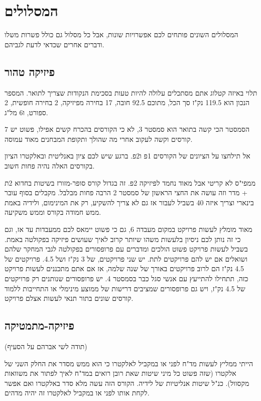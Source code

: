 \documentclass[a4paper,12pt]{article}
\begin{document}
\section{המסלולים}

המסלולים השונים פותחים לכם אפשרויות שונות, אבל כל מסלול גם כולל פשרות משלו ודברים אחרים שכדאי לדעת לגביהם.

\subsection{פיזיקה טהור}

תלוי באיזה קטלוג אתם מסתכלים עלולה להיות טעות בסכימת הנקודות שצריך לתואר. המספר הנכון הוא 119.5 נק"ז סך הכל, מתוכם 92.5 חובה, 17 בחירה מפיזיקה, 2 בחירה חופשית, 2 ספורט, ו6 מל"ג.

הסמסטר הכי קשה בתואר הוא סמסטר 3, לא כי הקורסים בהכרח קשים אפילו, פשוט יש 7 קורסים וקשה לעקוב אחרי מה שהולך ותקופת המבחנים מאוד עמוסה.

אל תילחצו על הציונים של הקורסים 1פ ו2פ. ברגע שיש לכם ציון באנליטית ובאלקטרו הציון בקורסים האלה נהיה פחות חשוב.

ממפי"ס לא קריטי אבל מאוד נחמד לפיזיקה 2פ. זה בגדול קורס סופר-מזורז בשיטות בחדוא 2ת + מדר וזה עושה את החצי הראשון של סמסטר 2 הרבה פחות מבלבל. מקבלים בסוף עובר בינארי וצריך איזה 40 בשביל לעבור אז גם לא צריך להשקיע, רק את המינימום, ולידיה באמת ממש חמודה בקורס וממש משקיעה.

מאוד מומלץ לעשות פרויקט במקום מעבדה 6, גם כי פשוט יימאס לכם ממעבדות עד אז, וגם כי זה נותן לכם ניסיון בלעשות משהו שיותר קרוב לאיך שעושים פיזיקה בפקולטה באמת. בשביל לעשות פרויקט פשוט הולכים ומדברים עם פרופסורים בפקולטה לגבי המחקר שלהם ושואלים אם יש להם פרויקטים לתת. יש שני פרויקטים, של 3 נק"ז ושל 4.5. פרויקטים של 4.5 נק"ז הם לרוב פרויקטים באורך של שנה שלמה, אז אם אתם מתכננים לעשות פרויקט כזה, תתחילו להתייעץ עם אנשי סגל כבר בסמסטר 4. יש פרופסורים שנותנים רק פרויקטים של 4.5 נק"ז, ויש גם פרופסורים שמציבים דרישות של ממוצע מינימלי או התחייבות ללמוד קורסים שונים בתור תנאי לעשות אצלם פרויקט.

\subsection{פיזיקה-מתמטיקה}

(תודה לשי אברהם על הסעיף)

הייתי ממליץ לעשות מד"ח לפני או במקביל לאלקטרו כי הוא ממש מסדר את החלק השני של אלקטרו (שזה פשוט כל מיני שיטות שאת רובן רואים במד"ח לאיך לפתור את משוואות מקסוול). כנ"ל שיטות אנליטיות של לידיה. הקורס הזה עשה מלא סדר באלקטרו ואם אפשר לקחת אותו לפני או במקביל לאלקטרו זה יהיה מדהים.
\end{document}
